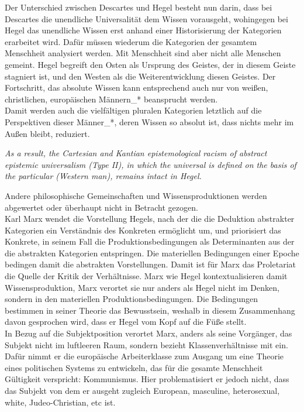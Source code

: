 \noindent Der Unterschied zwischen Descartes und Hegel besteht nun darin, dass bei
Descartes die unendliche Universalität dem Wissen vorausgeht, wohingegen bei
Hegel das unendliche Wissen erst anhand einer Historisierung der Kategorien
erarbeitet wird. Dafür müssen wiederum die Kategorien der gesamtem Menschheit
analysiert werden.  Mit Menschheit sind aber nicht alle Menschen gemeint. Hegel
begreift den Osten als Ursprung des Geistes, der in diesem Geiste stagniert
ist, und den Westen als die Weiterentwicklung diesen Geistes. Der Fortschritt,
das absolute Wissen kann entsprechend auch nur von weißen, christlichen,
europäischen Männern\_* beansprucht werden.\\
Damit werden auch die vielfältigen pluralen Kategorien letztlich auf die
Perspektiven dieser Männer\_*, deren Wissen so absolut ist, dass nichts mehr im
Außen bleibt, reduziert.  
\begin{myenv} 
  \textit{\glqq As a result, the Cartesian and Kantian
  epistemological racism of abstract epistemic universalism (Type II), in which
the universal is defined on the basis of the particular (Western man), remains
intact in Hegel.\grqq \footnotemark {} }
\end{myenv}
Andere philosophische Gemeinschaften und Wissensproduktionen werden abgewertet oder überhaupt nicht in Betracht gezogen.\\

Karl Marx wendet die Vorstellung Hegels, nach der die die Deduktion abstrakter
Kategorien ein Verständnis des Konkreten ermöglicht um, und priorisiert das
Konkrete, in seinem Fall die Produktionsbedingungen als Determinanten aus der
die abstrakten Kategorien entspringen.\footnotemark {} Die materiellen Bedingungen einer
Epoche bedingen damit die abstrakten Vorstellungen. Damit ist für Marx das
Proletariat die Quelle der Kritik der Verhältnisse. Marx wie Hegel
kontextualisieren damit Wissensproduktion, Marx verortet sie nur anders als
Hegel nicht im Denken, sondern in den materiellen Produktionsbedingungen. Die
Bedingungen bestimmen in seiner Theorie das Bewusstsein, weshalb in diesem
Zusammenhang davon gesprochen wird, dass er Hegel vom Kopf auf die Füße stellt.\\
In Bezug auf die Subjektposition verortet Marx, anders als seine Vorgänger, das
Subjekt nicht im luftleeren Raum, sondern bezieht Klassenverhältnisse mit ein.
Dafür nimmt er die europäische Arbeiterklasse zum Ausgang um eine Theorie eines
politischen Systems zu entwickeln, das für die gesamte Menschheit Gültigkeit
verspricht: Kommunismus. Hier problematisiert er jedoch nicht, dass das Subjekt
von dem er ausgeht zugleich  \glqq European, masculine, heterosexual, white,
Judeo-Christian, etc \grqq \footnotemark {} ist.\\

